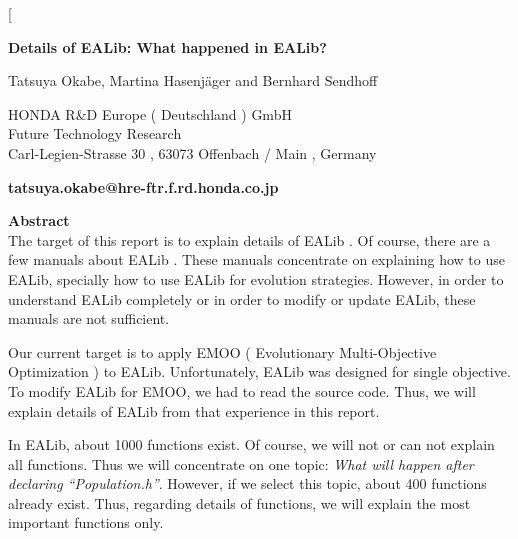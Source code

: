 \documentclass[twocolumn]{article}
\begin{document}
\twocolumn[

]

\clearpage

\twocolumn[

]

\clearpage

\twocolumn[

\begin{center}

{\bf {\LARGE Details of EALib: What happened in EALib?}}\\

\vspace*{10mm}

Tatsuya Okabe, Martina Hasenj\"{a}ger and Bernhard Sendhoff \\

\vspace*{10mm}

HONDA R\&D Europe ( Deutschland ) GmbH\\
Future Technology Research\\
Carl-Legien-Strasse 30 , 63073 Offenbach / Main , Germany\\

\vspace*{3mm}

{\bf tatsuya.okabe@hre-ftr.f.rd.honda.co.jp}\\

\end{center}

\vspace*{10mm}

\noindent
{\bf Abstract}\\
\normalsize
\noindent
The target of this report is to explain details of EALib \cite{EALib-int-1997}. 
Of course, there are a few manuals about EALib \cite{EALib-Man-2000}
\cite{EALib-Qui-2000} \cite{EALib-Ref-2000}. These manuals concentrate on
explaining how to use EALib, specially how to use EALib for evolution
strategies. However, in order to understand EALib completely or in
order to modify or update EALib, these manuals are not sufficient. 

\noindent
Our current target is to apply EMOO ( Evolutionary Multi-Objective
Optimization ) to EALib. Unfortunately, EALib was
designed for single objective. To modify EALib for EMOO, we had to
read the source
code. Thus, we will explain details of EALib from that experience in
this report.

\noindent
In EALib, about 1000 functions exist. Of course, we will not or can not
explain all functions. Thus we will concentrate on one topic: {\em What will
happen after declaring ``Population.h''}. However, if we select this
topic, about 400 functions already exist. Thus, regarding details of
functions, we will  explain the most important functions only.
\end{document}
